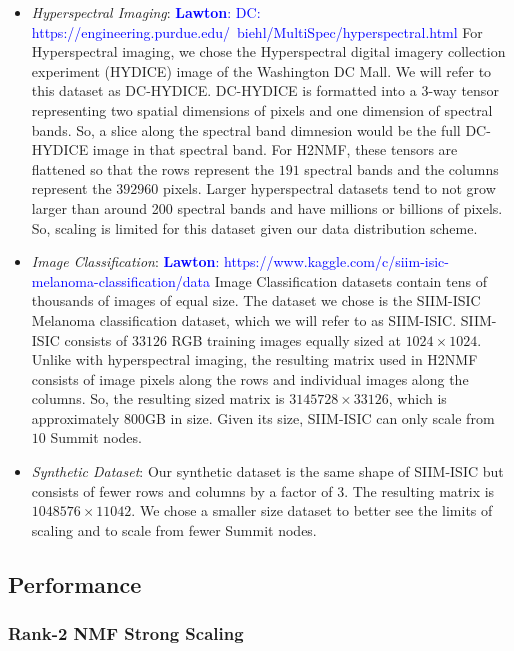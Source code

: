 \documentclass[conference,compsoc]{IEEEtran}
\newcommand{\LM}[1]{\textcolor{blue}{\textbf{Lawton}: #1}}
\newcommand{\hyper}{DC-HYDICE}
\newcommand{\image}{SIIM-ISIC}
\begin{document}
\begin{itemize}
	\item \textit{Hyperspectral Imaging}:
	\LM{DC: https://engineering.purdue.edu/~biehl/MultiSpec/hyperspectral.html}
	For Hyperspectral imaging, we chose the Hyperspectral digital imagery collection experiment (HYDICE) image of the Washington DC Mall. We will refer
	to this dataset as \hyper{}.
	\hyper{} is formatted into a 3-way tensor representing two spatial dimensions of pixels and one dimension of spectral bands. So, a slice along
	the spectral band dimnesion would be the full \hyper{} image in that spectral band. For H2NMF, these tensors are flattened so that the rows represent the
	$191$ spectral bands and the columns represent the $392960$ pixels. 
	Larger hyperspectral datasets tend to not grow larger than around 200 spectral bands and have millions or billions of pixels. So, scaling is 
	limited for this dataset given our data distribution scheme.
	\item \textit{Image Classification}:
	\LM{https://www.kaggle.com/c/siim-isic-melanoma-classification/data}
	Image Classification datasets contain tens of thousands of images of equal size. The dataset we chose is the SIIM-ISIC Melanoma classification
	dataset, which we will refer to as \image{}. \image{} consists of $33126$ RGB training images equally sized at $1024 \times 1024$. Unlike with hyperspectral imaging, the resulting
	matrix used in H2NMF consists of image pixels along the rows and individual images along the columns. So, the resulting sized matrix is
	$3145728 \times 33126$, which is approximately 800GB in size. 
	Given its size, \image{} can only scale from $10$ Summit nodes.
	\item \textit{Synthetic Dataset}:
	Our synthetic dataset is the same shape of \image{} but consists of fewer rows and columns by a factor of $3$. The resulting matrix is $1048576 \times 11042$. 
	We chose a smaller size dataset to better see the limits of scaling and to scale from fewer Summit nodes.
\end{itemize}

\subsection{Performance}
\label{sec:perf}

\subsubsection{Rank-2 NMF Strong Scaling}
\end{document}
